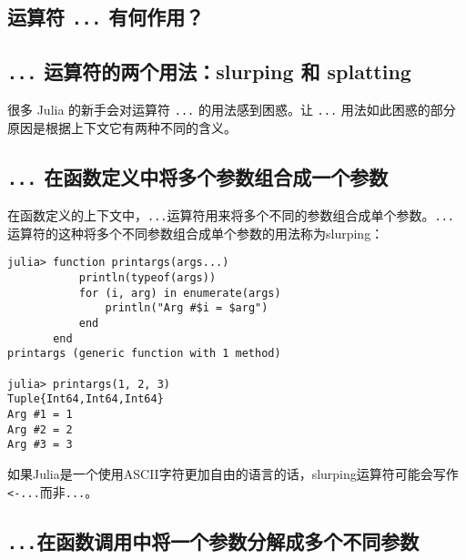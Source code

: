 \hypertarget{425348862563535930}{}


\subsection{运算符 \texttt{...} 有何作用？}



\hypertarget{6176809975782961444}{}


\subsection{\texttt{...} 运算符的两个用法：slurping 和 splatting}



很多 Julia 的新手会对运算符 \texttt{...} 的用法感到困惑。让 \texttt{...} 用法如此困惑的部分原因是根据上下文它有两种不同的含义。



\hypertarget{7095517523544633865}{}


\subsection{\texttt{...} 在函数定义中将多个参数组合成一个参数}



在函数定义的上下文中，\texttt{...}运算符用来将多个不同的参数组合成单个参数。\texttt{...}运算符的这种将多个不同参数组合成单个参数的用法称为slurping：




\begin{verbatim}
julia> function printargs(args...)
           println(typeof(args))
           for (i, arg) in enumerate(args)
               println("Arg #$i = $arg")
           end
       end
printargs (generic function with 1 method)

julia> printargs(1, 2, 3)
Tuple{Int64,Int64,Int64}
Arg #1 = 1
Arg #2 = 2
Arg #3 = 3
\end{verbatim}



如果Julia是一个使用ASCII字符更加自由的语言的话，slurping运算符可能会写作\texttt{<-...}而非\texttt{...}。



\hypertarget{4752115827323838494}{}


\subsection{\texttt{...}在函数调用中将一个参数分解成多个不同参数}



